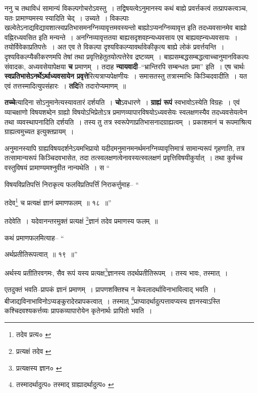 \documentclass[article,12pt,a4paper]{memoir}
\begin{document}
	  \pstart ननु च तथाविधं सामान्यं विकल्पगोचरोऽवस्तु । तद्विषयत्वेऽनुमानस्य कथं बाह्ये प्रवर्त्तकत्वं तत्प्रापकत्वञ्च, यतः प्रामाण्यमस्य स्यादिति चेद् । उच्यते । विकल्पाः खल्वेतेऽनाद्यविद्यावशात्स्वप्रतिभासमनग्निव्यावृत्तमवस्यन्तो बाह्योऽप्यनग्निव्यावृत्त इति तदध्यवसानमेव बाह्यो वह्निरध्यवसित इति मन्यन्ते । अनग्निव्यावृत्ततया बाह्यसदृशवह्न्यध्यवसाय एव बाह्यवह्न्यध्यवसायः । तयोर्विवेकाप्रतिपत्तेः । अत एव ते विकल्पा दृश्यविकल्प्यावर्थावेकीकृत्य बाह्ये लोकं प्रवर्त्तयन्ति । दृश्यविकल्प्यैकीकरणमपि तेषां तथा प्रवृत्तिहेतुतयोत्पत्तेरेव द्रष्टव्यम् । \leavevmode{} बाह्यसम्बद्धसम्बद्धत्वाच्चानुमानविकल्पः संवादकः, अध्यवसेयापेक्षया \textbf{च} प्रमाणम् । तदाह \textbf{न्यायवादी}--“भ्रान्तिरपि सम्बन्धतः प्रमा” इति । एष चार्थः \textbf{स्वप्रतिभासेऽनर्थेऽर्थाध्यवसायेन प्रवृत्ते}रित्यत्राप्यपेक्षणीयः । समासतस्तु तत्रास्माभिः किञ्चिदवादीति । यत एवं तत्तस्मादित्युपसंहारः । \textbf{तदि}ति तदारोप्यमाणम् ॥
	\pend
      

	  \pstart \textbf{तच्चे}त्यादिना सोऽनुमानेत्यस्यावतारं दर्शयति । \textbf{चो}ऽवधारणे । \textbf{ग्राह्यं रूपं} स्वभावोऽस्येति विग्रहः । एवं व्याचक्षाणो विषयशब्देन ग्राह्यो विषयोऽभिप्रेतोऽत्र प्रमाणव्यापारविषयोऽध्यवसेयः स्वलक्षणस्यैव तदध्यवसेयत्वेन तथा व्यवस्थापनादिति दर्शयति । तस्य तु तत्र स्वरूपेणाप्रतिभासनादग्राह्यत्वम् । प्रकाशमानं च रूपमाश्रित्य ग्राह्यत्वमुच्यत इत्युक्तप्रायम् ।
	\pend
      

	  \pstart अनुमानस्यापि ग्राह्यविषयदर्शनेऽयमभिप्रायो यदीदमनुमानमनर्थमनग्निव्यावृत्तिमात्रं सामान्यरूपं गृहणाति, तत्र तत्सामान्यरूपं किञ्चिदवभासेत, तदा तत्स्वलक्षणत्वेनावस्यत्स्वलक्षणं प्रवृत्तिविषयीकुर्यात् । तथा कुर्वच्च वस्तुविषयं प्रामाण्यमश्नुवीत नान्यथेति । स \leavevmode{} “
	  
	विषयविप्रतिपत्तिं निराकृत्य फलविप्रतिपर्त्तिं निराकर्त्तुमाह-- “
	  
	तदेव\footnote{तदेव प्रत्य० \cite{dp-msC}} च प्रत्यक्षं ज्ञानं प्रमाणफलम् ॥ १८ ॥” 
	  
	तदेवेति । यदेवानन्तरमुक्तं प्रत्यक्षं \footnote{प्रत्यक्षं तदेव \cite{dp-msA} \cite{dp-msB} \cite{dp-edP} \cite{dp-edH} \cite{dp-edE}}ज्ञानं तदेव प्रमाणस्य फलम् ॥ 
	  
	कथं प्रमाणफलमित्याह-- “
	  
	अर्थप्रतीतिरूपत्वात् ॥ १९ ॥” 
	  
	अर्थस्य प्रतीतिरवगमः, सैव रूपं यस्य प्रत्यक्ष\footnote{प्रत्यक्षस्य ज्ञान० \cite{dp-msD}}ज्ञानस्य तदर्थप्रतीतिरूपम् । तस्य भावः, तस्मात् । 
	  
	एतदुक्तं भवति--प्रापकं ज्ञानं प्रमाणम् । प्रापणशक्तिश्च न केवलादर्थाविनाभावित्वाद् भवति । बीजाद्यविनाभाविनोऽप्यङ्कुरादेरप्रापकत्वात् । तस्मात् \footnote{तस्मादर्थादुत्प० \cite{dp-msA} \cite{dp-edP} \cite{dp-edH} \cite{dp-edE} तस्माद् ग्राह्यादर्थादुत्प० \cite{dp-edN}}प्राप्यादर्थादुत्पत्तावप्यस्य ज्ञानस्याऽस्ति कश्चिदवश्यकर्त्तव्यः प्रापकव्यापारोयेन कृतेनार्थः प्रापितो भवति । 
	  
\end{document}
